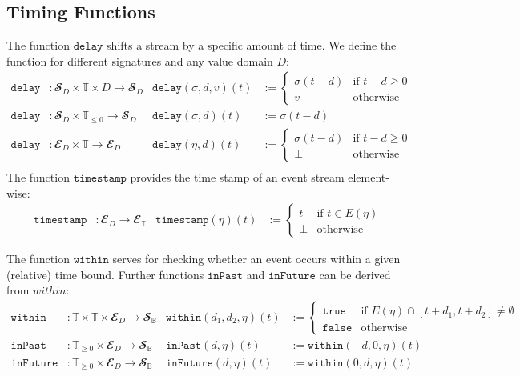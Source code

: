 \subsection{Timing Functions}


The function $\mathtt{delay}$ shifts a stream by a specific amount of time.
We define the function for different signatures and any value domain $D$:
\begin{align*}
  \mathtt{delay}&: 𝓢_D × 𝕋 × D → 𝓢_D 
    & \mathtt{delay}(σ,d,v)(t) &:= \begin{cases} 
         σ(t-d) & \text{if } t-d≥0\\
         v      & \text{otherwise}
       \end{cases}\\
  \mathtt{delay}&: 𝓢_D × 𝕋_{≤0} → 𝓢_D 
    & \mathtt{delay}(σ,d)(t) &:= σ(t-d) \\
  \mathtt{delay}&: 𝓔_D × 𝕋 → 𝓔_D 
      & \mathtt{delay}(η,d)(t) &:= \begin{cases} 
           σ(t-d) & \text{if } t-d≥0\\
           ⊥      & \text{otherwise}
         \end{cases}\\
\end{align*}
The function $\mathtt{timestamp}$ provides the time stamp of an event stream element-wise:
\begin{align*}
  \mathtt{timestamp}&: 𝓔_D → 𝓔_𝕋 
    & \mathtt{timestamp}(η)(t) &:= \begin{cases}
        t & \text{if } t∈E(η)\\
        ⊥ & \text{otherwise}
      \end{cases}
\end{align*}

The function $\mathtt{within}$ serves for checking whether an event occurs within a given (relative) time bound. 
Further functions $\mathtt{inPast}$ and $\mathtt{inFuture}$ can be derived from $within$:
\begin{align*}
  \mathtt{within}&: 𝕋 × 𝕋 × 𝓔_D → 𝓢_𝔹 
    & \mathtt{within}(d_1,d_2,η)(t) &:= \begin{cases}
        \mathtt{true} & \text{if } E(η)∩[t+d_1,t+d_2]≠∅\\        
        \mathtt{false} & \text{otherwise}
      \end{cases}\\
  \mathtt{inPast}&: 𝕋_{≥0} × 𝓔_D → 𝓢_𝔹 
    & \mathtt{inPast}(d,η)(t) &:= \mathtt{within}(-d,0,η)(t)\\
  \mathtt{inFuture}&: 𝕋_{≥0} × 𝓔_D → 𝓢_𝔹 
    & \mathtt{inFuture}(d,η)(t) &:= \mathtt{within}(0,d,η)(t)
\end{align*}

